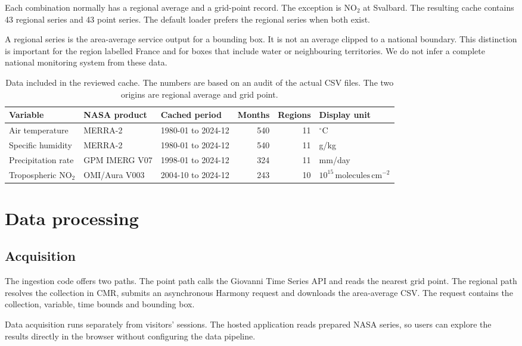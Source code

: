 \documentclass[10pt,a4paper,twocolumn]{article}
\newcommand{\unitno}{\ensuremath{10^{15}\,\mathrm{molecules\,cm^{-2}}}}
\begin{document}
Each combination normally has a regional average and a grid-point record. The exception is NO$_2$ at Svalbard. The resulting cache contains 43 regional series and 43 point series. The default loader prefers the regional series when both exist.

A regional series is the area-average service output for a bounding box. It is not an average clipped to a national boundary. This distinction is important for the region labelled France and for boxes that include water or neighbouring territories. We do not infer a complete national monitoring system from these data.

\begin{table}[t]
\centering\small
\caption{Data included in the reviewed cache. The numbers are based on an audit of the actual CSV files. The two origins are regional average and grid point.}
\label{tab:data}
\begin{tabularx}{\textwidth}{@{}l l l r r X@{}}
\toprule
Variable & NASA product & Cached period & Months & Regions & Display unit \\
\midrule
Air temperature & MERRA-2 & 1980-01 to 2024-12 & 540 & 11 & $^\circ$C \\
Specific humidity & MERRA-2 & 1980-01 to 2024-12 & 540 & 11 & g/kg \\
Precipitation rate & GPM IMERG V07 & 1998-01 to 2024-12 & 324 & 11 & mm/day \\
Tropospheric NO$_2$ & OMI/Aura V003 & 2004-10 to 2024-12 & 243 & 10 & \unitno \\
\bottomrule
\end{tabularx}
\end{table}

\section{Data processing}
\subsection{Acquisition}
The ingestion code offers two paths. The point path calls the Giovanni Time Series API and reads the nearest grid point. The regional path resolves the collection in CMR, submits an asynchronous Harmony request and downloads the area-average CSV. The request contains the collection, variable, time bounds and bounding box.

Data acquisition runs separately from visitors' sessions. The hosted application reads prepared NASA series, so users can explore the results directly in the browser without configuring the data pipeline.
\end{document}
